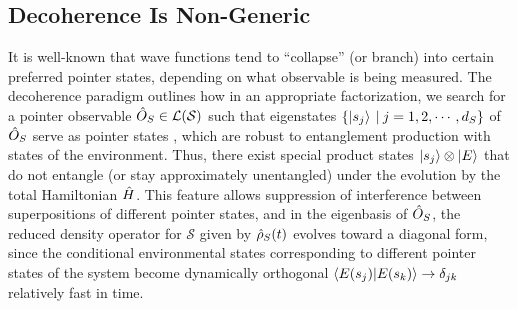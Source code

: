 \documentclass[aps,pra,onecolumn,nofootinbib,11pt,tightenlines]{revtex4-1}
\begin{document}
\subsection{Decoherence Is Non-Generic}
\label{sec:decoherence_feature}
 
It is well-known that wave functions tend to ``collapse'' (or branch) into certain preferred pointer states, depending on what observable is being measured. The decoherence paradigm outlines how in an appropriate factorization, we search for a  {pointer observable} $\hat{O}_{S} \in \mathcal{L}(\mathcal{S}) $ such that eigenstates $\{\ket{s_{j}} \: | \: j = 1,2,\cdots,d_{S} \}$ of $\hat{O}_{S}$   serve as  {pointer states} \cite{Zurek:1981xq}, which are robust to entanglement production with states of the environment. Thus, there exist special product states $\ket{s_{j}} \otimes \ket{E}$ that do not entangle (or stay approximately unentangled) under the evolution by the total Hamiltonian $\hat{H}$. This feature allows suppression of interference between superpositions of different pointer states, and in the eigenbasis of $\hat{O}_{S}$, the reduced density operator for $\mathcal{S}$ given by $\hat{\rho}_{S}(t)$ evolves toward a diagonal form, since the conditional environmental states corresponding to different pointer states of the system become  {dynamically} orthogonal $\braket{E(s_j)|E(s_{k})} \to \delta_{jk}$ relatively fast in time. 
\end{document}

